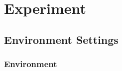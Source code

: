 \section{Experiment}

\subsection{Environment Settings}
\begin{frame}
    \frametitle{Environment}
\end{frame}